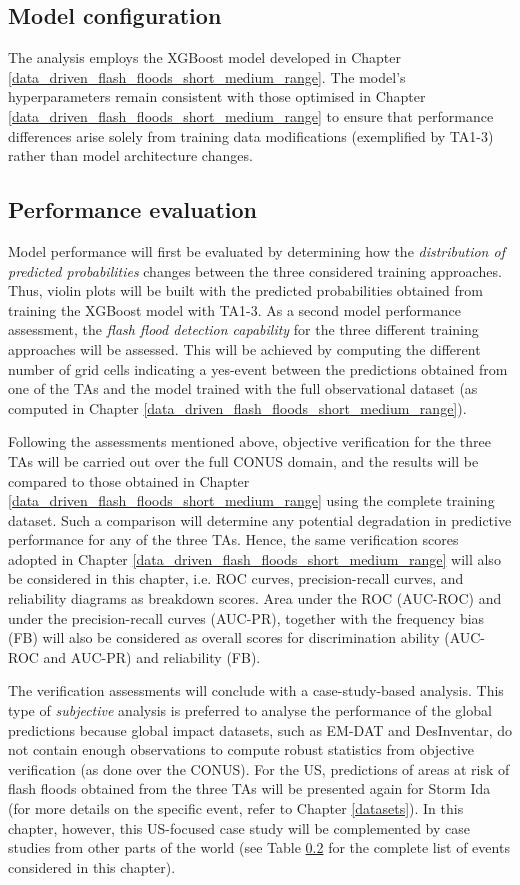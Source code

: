 \subsection{Model configuration}
The analysis employs the XGBoost model developed in Chapter \ref{data_driven_flash_floods_short_medium_range}. The model's hyperparameters remain consistent with those optimised in Chapter \ref{data_driven_flash_floods_short_medium_range} to ensure that performance differences arise solely from training data modifications (exemplified by TA1-3) rather than model architecture changes. 
 
\subsection{Performance evaluation}

Model performance will first be evaluated by determining how the \textit{distribution of predicted probabilities} changes between the three considered training approaches. Thus, violin plots will be built with the predicted probabilities obtained from training the XGBoost model with TA1-3. As a second model performance assessment, the \textit{flash flood detection capability} for the three different training approaches will be assessed. This will be achieved by computing the different number of grid cells indicating a yes-event between the predictions obtained from one of the TAs and the model trained with the full observational dataset (as computed in Chapter \ref{data_driven_flash_floods_short_medium_range}).

Following the assessments mentioned above, objective verification for the three TAs will be carried out over the full CONUS domain, and the results will be compared to those obtained in Chapter \ref{data_driven_flash_floods_short_medium_range} using the complete training dataset. Such a comparison will determine any potential degradation in predictive performance for any of the three TAs. Hence, the same verification scores adopted in Chapter \ref{data_driven_flash_floods_short_medium_range} will also be considered in this chapter, i.e. ROC curves, precision-recall curves, and reliability diagrams as breakdown scores. Area under the ROC (AUC-ROC) and under the precision-recall curves (AUC-PR), together with the frequency bias (FB) will also be considered as overall scores for discrimination ability (AUC-ROC and AUC-PR) and reliability (FB).
 
The verification assessments will conclude with a case-study-based analysis. This type of \textit{subjective} analysis is preferred to analyse the performance of the global predictions because global impact datasets, such as EM-DAT and DesInventar, do not contain enough observations to compute robust statistics from objective verification (as done over the CONUS). For the US, predictions of areas at risk of flash floods obtained from the three TAs will be presented again for Storm Ida (for more details on the specific event, refer to Chapter \ref{datasets}). In this chapter, however, this US-focused case study will be complemented by case studies from other parts of the world (see Table \ref{} for the complete list of events considered in this chapter).

